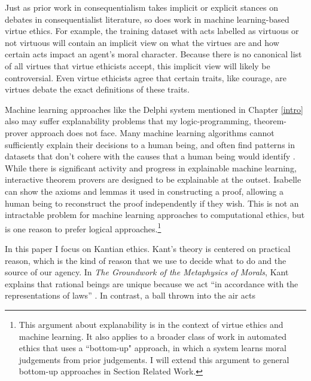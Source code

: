 \begin{isabellebody}
\begin{isamarkuptext}
Just as prior work in consequentialism takes implicit or explicit stances on debates in consequentialist
literature, so does work in machine learning-based virtue ethics. For example, the training 
dataset with acts labelled as virtuous or not virtuous will contain an implicit view on what the virtues
are and how certain acts impact an agent's moral character. Because there is no canonical list of all virtues
that virtue ethicists accept, this implicit view will likely be controversial. Even virtue ethicists agree
that certain traits, like courage, are virtues debate the exact definitions of these traits.

Machine learning approaches like the Delphi system \citep{delphi} mentioned in Chapter \ref{intro} also may suffer explanability 
problems that my logic-programming, theorem-prover
approach does not face. Many machine learning algorithms cannot sufficiently explain their 
decisions to a human being, and often find patterns in datasets that don't 
cohere with the causes that a human being would identify \citep{puiutta}. While there is significant activity 
and progress in explainable machine learning, interactive theorem provers are designed to be explainable 
at the outset. Isabelle can show the axioms and lemmas it used in constructing a proof, 
allowing a human being to reconstruct the proof independently if they wish. This is not an 
intractable problem for machine learning approaches to computational ethics, but is one reason to 
prefer logical approaches.\footnote{This argument about explanability is in the context of virtue ethics and 
machine learning. It also applies to a broader class of work in automated ethics 
that uses a ``bottom-up" approach, in which a system learns moral judgements from prior judgements. 
I will extend this argument to general bottom-up approaches in Section Related Work.}%
\end{isamarkuptext}\isamarkuptrue%
%
\isadelimdocument
%
\endisadelimdocument
%
\isatagdocument
%
\isamarkuptrue%
%
\endisatagdocument
{\isafolddocument}%
%
\isadelimdocument
%
\endisadelimdocument
%
\begin{isamarkuptext}%
In this paper I focus on Kantian ethics. Kant's theory is centered 
on practical reason, which is the kind of reason that we 
use to decide what to do and the source of our agency. In \emph{The Groundwork of the Metaphysics of Morals}, Kant explains that 
rational beings are unique because we act ``in accordance with 
the representations of laws'' \citep[4:412]{groundwork}. In contrast, a ball thrown into the air acts 

\end{isamarkuptext}
\end{isabellebody}
